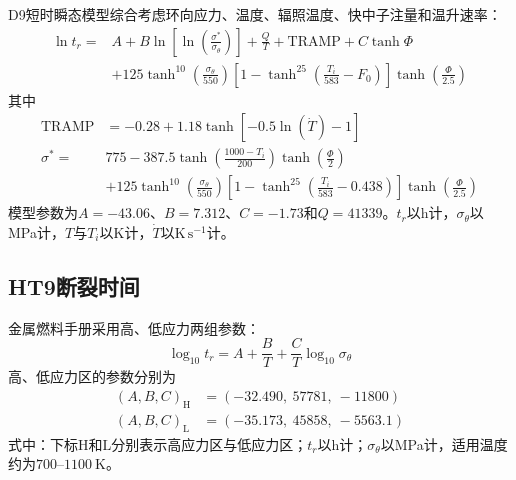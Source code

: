 D9短时瞬态模型综合考虑环向应力、温度、辐照温度、快中子注量和温升速率\cite{FanningSAS4ASASSYS1Safety2017}：
\begin{equation}
	\label{eq:appendix_d9_transient_rupture_time}
	\begin{aligned}
		\ln t_r
		={}&A+B\ln\!\left[
		\ln\!\left(\frac{\sigma^*}{\sigma_\theta}\right)
		\right]
		+\frac{Q}{T}
		+\mathrm{TRAMP}
		+C\tanh\Phi
		\\
		&+125\tanh^{10}\!\left(\frac{\sigma_\theta}{550}\right)
		\left[1-\tanh^{25}\!\left(\frac{T_i}{583}-F_0\right)\right]
		\tanh\!\left(\frac{\Phi}{2.5}\right)
	\end{aligned}
\end{equation}
其中
\begin{equation}
	\label{eq:appendix_d9_transient_auxiliary_functions}
	\begin{aligned}
		\mathrm{TRAMP}
		&=-0.28+1.18\tanh[-0.5\ln(\dot T)-1]\\
		\sigma^*
		={}&775-387.5
		\tanh\!\left(\frac{1000-T_i}{200}\right)
		\tanh\!\left(\frac{\Phi}{2}
		\right)
		\\
		&+125\tanh^{10}\!\left(\frac{\sigma_\theta}{550}\right)
		\left[1-\tanh^{25}\!\left(\frac{T_i}{583}-0.438\right)\right]
		\tanh\!\left(\frac{\Phi}{2.5}\right)
	\end{aligned}
\end{equation}
模型参数为$A=-43.06$、$B=7.312$、$C=-1.73$和$Q=41339$。$t_r$以h计，$\sigma_\theta$以MPa计，$T$与$T_i$以K计，$\dot T$以$\mathrm{K\,s^{-1}}$计。

\subsection{HT9断裂时间}

金属燃料手册采用高、低应力两组参数：
\begin{equation}
	\log_{10}t_r
	=A+\frac{B}{T}
	+\frac{C}{T}\log_{10}\sigma_\theta
	\label{eq:appendix_ht9_mfh_rupture_time}
\end{equation}
高、低应力区的参数分别为
\begin{equation}
	\label{eq:appendix_ht9_mfh_rupture_parameters}
	\begin{aligned}
		(A,B,C)_{\mathrm H}
		&=(-32.490,\ 57781,\ -11800)\\
		(A,B,C)_{\mathrm L}
		&=(-35.173,\ 45858,\ -5563.1)
	\end{aligned}
\end{equation}
式中：下标$\mathrm H$和$\mathrm L$分别表示高应力区与低应力区；$t_r$以h计；$\sigma_\theta$以MPa计，适用温度约为$700$--$1100\ \mathrm{K}$。

